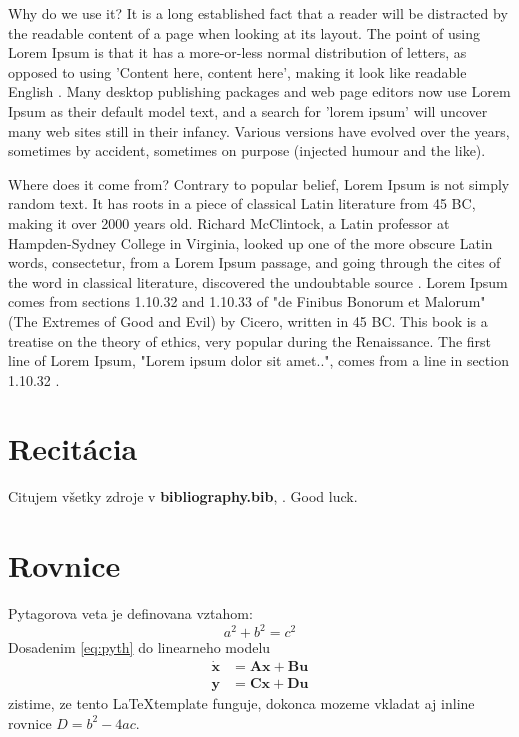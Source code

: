 Why do we use it? It is a long established fact that a reader will be distracted by the readable content of a page when looking at its layout. The point of using Lorem Ipsum is that it has a more-or-less normal distribution of letters, as opposed to using 'Content here, content here', making it look like readable English \cite{lipsum}. Many desktop publishing packages and web page editors now use Lorem Ipsum as their default model text, and a search for 'lorem ipsum' will uncover many web sites still in their infancy. Various versions have evolved over the years, sometimes by accident, sometimes on purpose (injected humour and the like).

Where does it come from? Contrary to popular belief, Lorem Ipsum is not simply random text. It has roots in a piece of classical Latin literature from 45 BC, making it over 2000 years old. Richard McClintock, a Latin professor at Hampden-Sydney College in Virginia, looked up one of the more obscure Latin words, consectetur, from a Lorem Ipsum passage, and going through the cites of the word in classical literature, discovered the undoubtable source \cite{lipsum}. Lorem Ipsum comes from sections 1.10.32 and 1.10.33 of "de Finibus Bonorum et Malorum" (The Extremes of Good and Evil) by Cicero, written in 45 BC. This book is a treatise on the theory of ethics, very popular during the Renaissance. The first line of Lorem Ipsum, "Lorem ipsum dolor sit amet..", comes from a line in section 1.10.32 \cite{lipsum}.

\section{Recitácia}
Citujem všetky zdroje v \textbf{bibliography.bib}, \cite{t00, t01, t02, t03, kniha, kniha2, kniha3, small, big, cs, koll, kap, tug, knuth, zbornik, prispevok}. \newline Good luck.

\section{Rovnice}
Pytagorova veta je definovana vztahom:
\begin{equation}
	a^2 + b^2 = c^2
	\label{eq:pyth}
\end{equation}
Dosadenim \eqref{eq:pyth} do linearneho modelu
\begin{align}
	\dot{\mathbf{x}} &= \mathbf{A} \mathbf{x} + \mathbf{B} \mathbf{u} \\
	\mathbf{y} &= \mathbf{C} \mathbf{x} + \mathbf{D} \mathbf{u}
	\label{eq:model}
\end{align}
zistime, ze tento \LaTeX template funguje, dokonca mozeme vkladat aj inline rovnice $D = b^2 - 4ac$.

